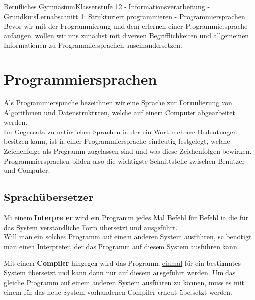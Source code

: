 \documentclass[11pt,oneside,openany,headings=optiontotoc,11pt,numbers=noenddot]{article}
\begin{document}
	\begin{worksheet}{Berufliches Gymnasium}{Klassenstufe 12 - Informationsverarbeitung - Grundkurs}{Lernabschnitt 1: Strukturiert programmieren - Programmiersprachen}
		\setlength{\columnseprule}{0pt}
		\noindent
		Bevor wir mit der Programmierung und dem erlernen einer Programmiersprache anfangen, wollen wir uns zunächst mit diversen Begrifflichkeiten und allgemeinen Informationen zu Programmiersprachen auseinandersetzen.
		\section{Programmiersprachen}
		Als Programmiersprache bezeichnen wir eine Sprache zur Formulierung von Algorithmen und Datenstrukturen, welche auf einem Computer abgearbeitet werden.\\
		Im Gegensatz zu natürlichen Sprachen in der ein Wort mehrere Bedeutungen besitzen kann, ist in einer Programmiersprache eindeutig festgelegt, welche Zeichenfolge als Programm zugelassen sind und was diese Zeichenfolgen bewirken.\\
		Programmiersprachen bilden also die wichtigste Schnittstelle zwischen Benutzer und Computer.
		\subsection{Sprachübersetzer}
		Mi einem \textbf{Interpreter} wird ein Programm jedes Mal Befehl für Befehl in die für das System verständliche Form übersetzt und ausgeführt.\\
		Will man ein solches Programm auf einem anderen System ausführen, so benötigt man einen Interpreter, der das Programm auf diesem System ausführen kann.\\
		\par\noindent
		Mit einem \textbf{Compiler} hingegen wird das Programm \underline{einmal} für ein bestimmtes System übersetzt und kann dann nur auf diesem ausgeführt werden. Um das gleiche Programm auf einem anderen System ausführen zu können, muss es mit einem für das neue System vorhandenen Compiler erneut übersetzt werden.

\end{worksheet}
\end{document}

